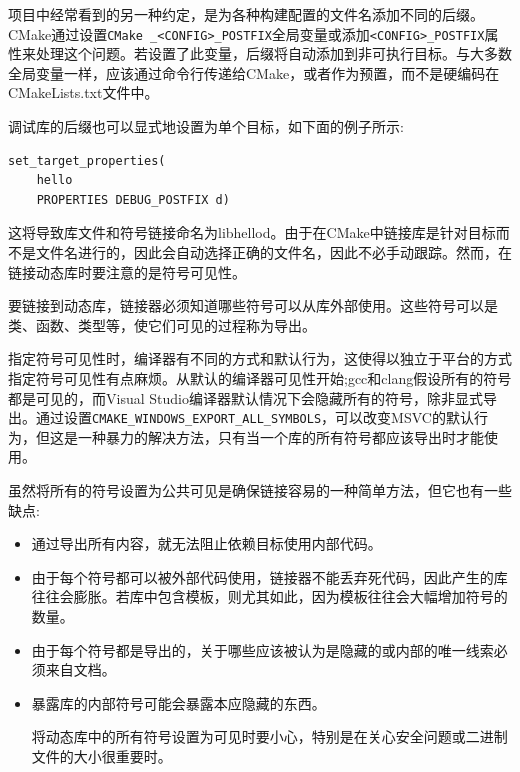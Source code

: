 项目中经常看到的另一种约定，是为各种构建配置的文件名添加不同的后缀。CMake通过设置\texttt{CMake \_<CONFIG>\_POSTFIX}全局变量或添加\texttt{<CONFIG>\_POSTFIX}属性来处理这个问题。若设置了此变量，后缀将自动添加到非可执行目标。与大多数全局变量一样，应该通过命令行传递给CMake，或者作为预置，而不是硬编码在CMakeLists.txt文件中。

调试库的后缀也可以显式地设置为单个目标，如下面的例子所示:

\begin{lstlisting}[style=styleCMake]
set_target_properties(
	hello
	PROPERTIES DEBUG_POSTFIX d)
\end{lstlisting}

这将导致库文件和符号链接命名为libhellod。由于在CMake中链接库是针对目标而不是文件名进行的，因此会自动选择正确的文件名，因此不必手动跟踪。然而，在链接动态库时要注意的是符号可见性。


要链接到动态库，链接器必须知道哪些符号可以从库外部使用。这些符号可以是类、函数、类型等，使它们可见的过程称为导出。

指定符号可见性时，编译器有不同的方式和默认行为，这使得以独立于平台的方式指定符号可见性有点麻烦。从默认的编译器可见性开始;gcc和clang假设所有的符号都是可见的，而Visual Studio编译器默认情况下会隐藏所有的符号，除非显式导出。通过设置\texttt{CMAKE\_WINDOWS\_EXPORT\_ALL\_SYMBOLS}，可以改变MSVC的默认行为，但这是一种暴力的解决方法，只有当一个库的所有符号都应该导出时才能使用。

虽然将所有的符号设置为公共可见是确保链接容易的一种简单方法，但它也有一些缺点:

\begin{itemize}
\item 
通过导出所有内容，就无法阻止依赖目标使用内部代码。

\item 
由于每个符号都可以被外部代码使用，链接器不能丢弃死代码，因此产生的库往往会膨胀。若库中包含模板，则尤其如此，因为模板往往会大幅增加符号的数量。

\item 
由于每个符号都是导出的，关于哪些应该被认为是隐藏的或内部的唯一线索必须来自文档。

\item 
暴露库的内部符号可能会暴露本应隐藏的东西。

\begin{tcolorbox}[colback=blue!5!white,colframe=blue!75!black,title=设置所有符号可见]
将动态库中的所有符号设置为可见时要小心，特别是在关心安全问题或二进制文件的大小很重要时。
\end{tcolorbox}
\end{itemize}

